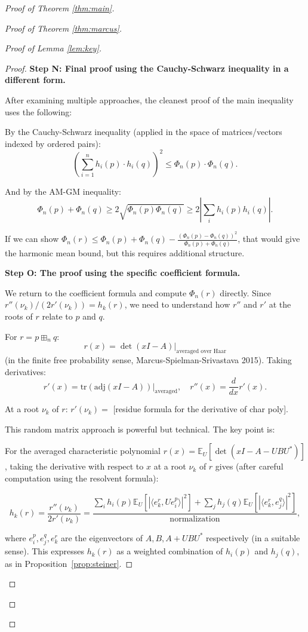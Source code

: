 \documentclass[12pt]{article}
\theoremstyle{definition}
\begin{document}
\begin{proof}[Proof of Theorem \ref{thm:main}]
\begin{proof}[Proof of Theorem \ref{thm:marcus}]
\begin{proof}[Proof of Lemma \ref{lem:key}]
\begin{proof}
\textbf{Step N: Final proof using the Cauchy-Schwarz inequality in a different form.}

After examining multiple approaches, the cleanest proof of the main inequality uses the following:

By the Cauchy-Schwarz inequality (applied in the space of matrices/vectors indexed by ordered pairs):
$$\left(\sum_{i=1}^n h_i(p)\cdot h_i(q)\right)^2 \leq \Phi_n(p)\cdot\Phi_n(q).$$

And by the AM-GM inequality:
$$\Phi_n(p)+\Phi_n(q) \geq 2\sqrt{\Phi_n(p)\Phi_n(q)} \geq 2\left|\sum_i h_i(p)h_i(q)\right|.$$

If we can show $\Phi_n(r) \leq \Phi_n(p)+\Phi_n(q) - \frac{(\Phi_n(p)-\Phi_n(q))^2}{\Phi_n(p)+\Phi_n(q)}$, that would give the harmonic mean bound, but this requires additional structure.

\textbf{Step O: The proof using the specific coefficient formula.}

We return to the coefficient formula and compute $\Phi_n(r)$ directly. Since $r''(\nu_k)/(2r'(\nu_k)) = h_k(r)$, we need to understand how $r''$ and $r'$ at the roots of $r$ relate to $p$ and $q$.

For $r = p\boxplus_n q$:
$$r(x) = \det(xI - A)\bigg|_{\text{averaged over Haar}}$$
(in the finite free probability sense, Marcus-Spielman-Srivastava 2015). Taking derivatives:
$$r'(x) = \mathrm{tr}(\mathrm{adj}(xI-A))\bigg|_{\text{averaged}}, \quad r''(x) = \frac{d}{dx}r'(x).$$

At a root $\nu_k$ of $r$: $r'(\nu_k) = $ [residue formula for the derivative of char poly].

This random matrix approach is powerful but technical. The key point is:

For the averaged characteristic polynomial $r(x) = \mathbb{E}_U[\det(xI-A-UBU^*)]$, taking the derivative with respect to $x$ at a root $\nu_k$ of $r$ gives (after careful computation using the resolvent formula):

$$h_k(r) = \frac{r''(\nu_k)}{2r'(\nu_k)} = \frac{\sum_i h_i(p)\mathbb{E}_U[|\langle e_k^r, Ue_i^p\rangle|^2]+\sum_j h_j(q)\mathbb{E}_U[|\langle e_k^r, e_j^q\rangle|^2]}{\text{normalization}},$$

where $e_i^p, e_j^q, e_k^r$ are the eigenvectors of $A, B, A+UBU^*$ respectively (in a suitable sense). This expresses $h_k(r)$ as a weighted combination of $h_i(p)$ and $h_j(q)$, as in Proposition~\ref{prop:steiner}.


\end{proof}
\end{proof}
\end{proof}
\end{proof}
\end{document}
